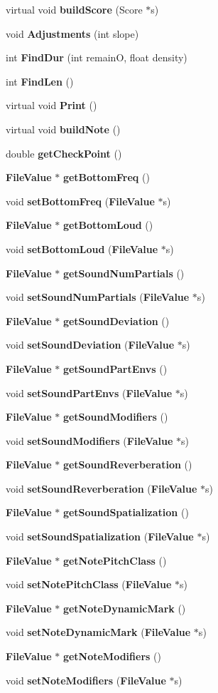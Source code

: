 \begin{CompactItemize}
virtual void {\bf build\-Score} (Score $\ast$s)
\item 
void {\bf Adjustments} (int slope)
\item 
int {\bf Find\-Dur} (int remain\-O, float density)
\item 
int {\bf Find\-Len} ()
\item 
virtual void {\bf Print} ()
\item 
virtual void {\bf build\-Note} ()
\item 
double {\bf get\-Check\-Point} ()
\item 
{\bf File\-Value} $\ast$ {\bf get\-Bottom\-Freq} ()
\item 
void {\bf set\-Bottom\-Freq} ({\bf File\-Value} $\ast$s)
\item 
{\bf File\-Value} $\ast$ {\bf get\-Bottom\-Loud} ()
\item 
void {\bf set\-Bottom\-Loud} ({\bf File\-Value} $\ast$s)
\item 
{\bf File\-Value} $\ast$ {\bf get\-Sound\-Num\-Partials} ()
\item 
void {\bf set\-Sound\-Num\-Partials} ({\bf File\-Value} $\ast$s)
\item 
{\bf File\-Value} $\ast$ {\bf get\-Sound\-Deviation} ()
\item 
void {\bf set\-Sound\-Deviation} ({\bf File\-Value} $\ast$s)
\item 
{\bf File\-Value} $\ast$ {\bf get\-Sound\-Part\-Envs} ()
\item 
void {\bf set\-Sound\-Part\-Envs} ({\bf File\-Value} $\ast$s)
\item 
{\bf File\-Value} $\ast$ {\bf get\-Sound\-Modifiers} ()
\item 
void {\bf set\-Sound\-Modifiers} ({\bf File\-Value} $\ast$s)
\item 
{\bf File\-Value} $\ast$ {\bf get\-Sound\-Reverberation} ()
\item 
void {\bf set\-Sound\-Reverberation} ({\bf File\-Value} $\ast$s)
\item 
{\bf File\-Value} $\ast$ {\bf get\-Sound\-Spatialization} ()
\item 
void {\bf set\-Sound\-Spatialization} ({\bf File\-Value} $\ast$s)
\item 
{\bf File\-Value} $\ast$ {\bf get\-Note\-Pitch\-Class} ()
\item 
void {\bf set\-Note\-Pitch\-Class} ({\bf File\-Value} $\ast$s)
\item 
{\bf File\-Value} $\ast$ {\bf get\-Note\-Dynamic\-Mark} ()
\item 
void {\bf set\-Note\-Dynamic\-Mark} ({\bf File\-Value} $\ast$s)
\item 
{\bf File\-Value} $\ast$ {\bf get\-Note\-Modifiers} ()
\item 
void {\bf set\-Note\-Modifiers} ({\bf File\-Value} $\ast$s)
\end{CompactItemize}
